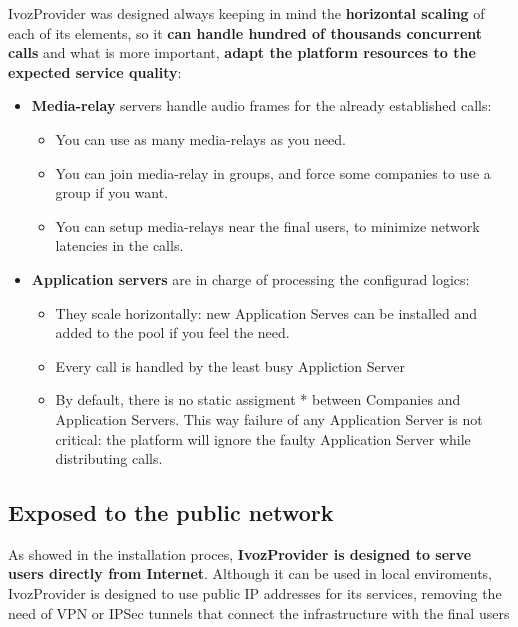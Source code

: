 \documentclass[letterpaper,10pt,english]{sphinxmanual}
\begin{document}
IvozProvider was designed always keeping in mind the \textbf{horizontal
scaling} of each of its elements, so it \textbf{can handle hundred of
thousands concurrent calls} and what is more important, \textbf{adapt the
platform resources to the expected service quality}:
\begin{itemize}
\item {} 
\textbf{Media-relay} servers handle audio frames for the already established
calls:
\begin{itemize}
\item {} 
You can use as many media-relays as you need.

\item {} 
You can join media-relay in groups, and force some companies to use a
group if you want.

\item {} 
You can setup media-relays near the final users, to minimize network
latencies in the calls.

\end{itemize}

\item {} 
\textbf{Application servers} are in charge of processing the configurad logics:
\begin{itemize}
\item {} 
They scale horizontally: new Application Serves can be installed and
added to the pool if you feel the need.

\item {} 
Every call is handled by the least busy Appliction Server

\item {} 
By default, there is no static assigment * between Companies and
Application Servers. This way failure of any Application Server is not
critical: the platform will ignore the faulty Application Server while
distributing calls.

\end{itemize}

\end{itemize}


\subsection{Exposed to the public network}
\label{basics/intro/what_is_ivozprovider:exposed-to-the-public-network}\label{basics/intro/what_is_ivozprovider:exposed}
As showed in the installation proces, \textbf{IvozProvider is designed to serve
users directly from Internet}. Although it can be used in local
enviroments, IvozProvider is designed to use public IP addresses for its
services, removing the need of VPN or IPSec tunnels that connect the
infrastructure with the final users
\end{document}

